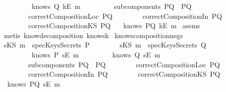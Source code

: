 \begin{isabellebody}
\ \ \ \ \ \ \ \ {\isachardoublequoteopen}{\isasymnot}\ knows\ Q\ {\isacharbrackleft}kE\ m{\isacharbrackright}{\isachardoublequoteclose}\ \isanewline
\ \ \ \ \ \ \ \ {\isachardoublequoteopen}subcomponents\ PQ\ {\isacharequal}\ {\isacharbraceleft}P{\isacharcomma}Q{\isacharbraceright}{\isachardoublequoteclose}\isanewline
\ \ \ \ \ \ \ \ {\isachardoublequoteopen}correctCompositionLoc\ PQ{\isachardoublequoteclose}\isanewline
\ \ \ \ \ \ \ \ {\isachardoublequoteopen}correctCompositionIn\ PQ{\isachardoublequoteclose}\isanewline
\ \ \ \ \ \ \ \ {\isachardoublequoteopen}correctCompositionKS\ PQ{\isachardoublequoteclose}\ \isanewline
{}\ {\isachardoublequoteopen}{\isasymnot}\ knows\ PQ\ {\isacharbrackleft}kE\ m{\isacharbrackright}{\isachardoublequoteclose}\isanewline
%
\isadelimproof
%
\endisadelimproof
%
\isatagproof
{}\isamarkupfalse%
\ assms\ \isamarkupfalse%
\ {\isacharparenleft}metis\ know{\isacharunderscore}decomposition\ knows{}k{\isacharparenright}%
\endisatagproof
{\isafoldproof}%
%
\isadelimproof
\isanewline
%
\endisadelimproof
\isanewline
{}\isamarkupfalse%
\ knows{\isacharunderscore}composition{\isacharunderscore}neg{}{\isacharunderscore}s{\isacharcolon}\isanewline
{}\ {\isachardoublequoteopen}sKS\ m\ {\isasymnotin}\ specKeysSecrets\ P{\isachardoublequoteclose}\isanewline
\ \ \ \ \ \ \ \ {\isachardoublequoteopen}sKS\ m\ {\isasymnotin}\ specKeysSecrets\ Q{\isachardoublequoteclose}\isanewline
\ \ \ \ \ \ \ \ {\isachardoublequoteopen}{\isasymnot}\ knows\ P\ {\isacharbrackleft}sE\ m{\isacharbrackright}{\isachardoublequoteclose}\isanewline
\ \ \ \ \ \ \ \ {\isachardoublequoteopen}{\isasymnot}\ knows\ Q\ {\isacharbrackleft}sE\ m{\isacharbrackright}{\isachardoublequoteclose}\ \isanewline
\ \ \ \ \ \ \ \ {\isachardoublequoteopen}subcomponents\ PQ\ {\isacharequal}\ {\isacharbraceleft}P{\isacharcomma}Q{\isacharbraceright}{\isachardoublequoteclose}\isanewline
\ \ \ \ \ \ \ \ {\isachardoublequoteopen}correctCompositionLoc\ PQ{\isachardoublequoteclose}\isanewline
\ \ \ \ \ \ \ \ {\isachardoublequoteopen}correctCompositionIn\ PQ{\isachardoublequoteclose}\isanewline
\ \ \ \ \ \ \ \ {\isachardoublequoteopen}correctCompositionKS\ PQ{\isachardoublequoteclose}\ \isanewline
{}\ {\isachardoublequoteopen}{\isasymnot}\ knows\ PQ\ {\isacharbrackleft}sE\ m{\isacharbrackright}{\isachardoublequoteclose}\isanewline

\end{isabellebody}
